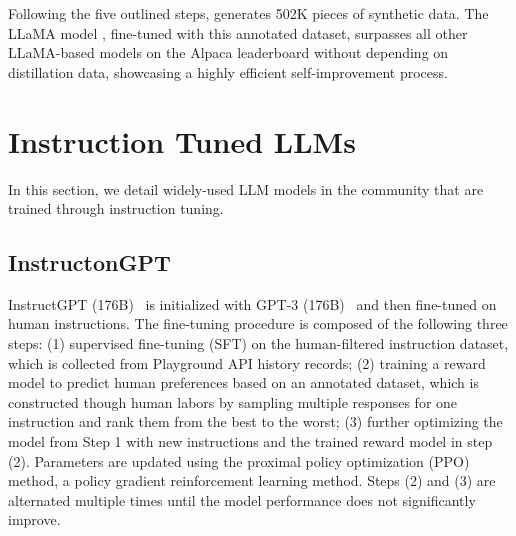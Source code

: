 \documentclass[11pt]{article}
\begin{document}
Following the five outlined steps, \citet{li2023self} generates 502K pieces of synthetic data. The LLaMA model \cite{touvron2023llama}, fine-tuned with this annotated dataset, surpasses all other LLaMA-based models on the Alpaca leaderboard without depending on distillation data, showcasing a highly efficient self-improvement process.




\section{Instruction Tuned LLMs} \label{sec:Instruction_fine-tuned_LLMs}

In this section, we detail widely-used LLM models in the community
that are trained through instruction tuning.
\subsection{InstructonGPT}
InstructGPT (176B)~\citep{ouyang2022training} is initialized with GPT-3 (176B)~\citep{Brown2020LanguageMA} and then fine-tuned on human instructions. The fine-tuning procedure is composed of the following three steps:  (1) supervised fine-tuning (SFT) on the human-filtered instruction dataset, which is collected from Playground API history records;
 (2) training a reward model  to predict human preferences 
based on an annotated dataset, which is constructed though 
 human labors by sampling multiple responses for one instruction and  rank them  from the best to the worst;  
 (3) further optimizing the  model from Step 1 with new instructions and the trained reward model in step  (2). 
 Parameters are updated using the proximal policy optimization (PPO)~\citep{Schulman2017ProximalPO} method, a policy gradient reinforcement learning method. 
Steps (2) and (3) are alternated multiple times until the model performance does not significantly improve.
\end{document}
